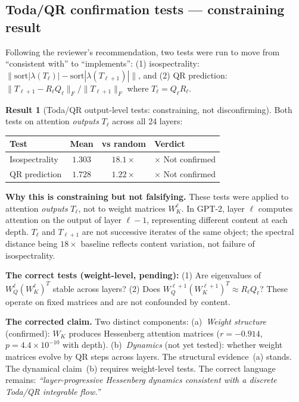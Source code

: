 \documentclass[11pt]{amsart}
\theoremstyle{definition}
\newtheorem{result}[theorem]{Result}
\begin{document}
\subsection{Toda/QR confirmation tests — constraining result}
\label{sec:toda-qr-tests}

Following the reviewer's recommendation, two tests were run to move from
``consistent with'' to ``implements'':
(1) isospectrality: $\|\mathrm{sort}|\lambda(T_\ell)| - \mathrm{sort}|\lambda(T_{\ell+1})|\|$,
and (2) QR prediction: $\|T_{\ell+1} - R_\ell Q_\ell\|_F / \|T_{\ell+1}\|_F$
where $T_\ell = Q_\ell R_\ell$.

\begin{result}[Toda/QR output-level tests: constraining, not disconfirming]
\label{result:toda-qr}
Both tests on attention \emph{outputs} $T_\ell$ across all 24 layers:
\begin{center}
\small
\begin{tabular}{@{}lccl@{}}
\toprule
Test & Mean & vs random & Verdict \\
\midrule
Isospectrality & $1.303$ & $18.1\times$ & $\times$ Not confirmed \\
QR prediction  & $1.728$ & $1.22\times$ & $\times$ Not confirmed \\
\bottomrule
\end{tabular}
\end{center}

\noindent\textbf{Why this is constraining but not falsifying.}
These tests were applied to attention \emph{outputs} $T_\ell$,
not to weight matrices $W_K^\ell$.
In GPT-2, layer $\ell$ computes attention on the output of layer $\ell-1$,
representing different content at each depth.
$T_\ell$ and $T_{\ell+1}$ are not successive iterates of the same object;
the spectral distance being $18\times$ baseline reflects content variation,
not failure of isospectrality.

\noindent\textbf{The correct tests (weight-level, pending):}
(1) Are eigenvalues of $W_Q^\ell(W_K^\ell)^T$ stable across layers?
(2) Does $W_Q^{\ell+1}(W_K^{\ell+1})^T \approx R_\ell Q_\ell$?
These operate on fixed matrices and are not confounded by content.

\noindent\textbf{The corrected claim.}
Two distinct components:
(a)~\emph{Weight structure} (confirmed): $W_K$ produces Hessenberg attention
matrices ($r=-0.914$, $p=4.4\times10^{-10}$ with depth).
(b)~\emph{Dynamics} (not yet tested): whether weight matrices evolve by
QR steps across layers.
The structural evidence~(a) stands.
The dynamical claim~(b) requires weight-level tests.
The correct language remains: \emph{``layer-progressive Hessenberg
dynamics consistent with a discrete Toda/QR integrable flow.''}
\end{result}
\end{document}
